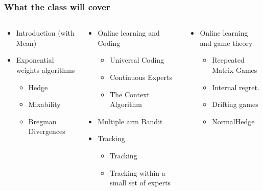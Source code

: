 \documentclass[handout]{beamer}
\begin{document}
\begin{small}
\begin{frame}
  \frametitle{What the class will cover}
  \begin{columns}
    \begin{column}[t]{3.5cm}
      \begin{itemize}
      \item Introduction (with Mean)
      \item Exponential weights algorithms
        \begin{itemize}
        \item Hedge
        \item Mixability
        \item Bregman Divergences
        \end{itemize}
      \end{itemize}
  \end{column}
  \begin{column}[t]{4.5cm}
    \begin{itemize}
    \item Online learning and Coding
      \begin{itemize}
      \item Universal Coding
      \item Continuous Experts
      \item The Context Algorithm
      \end{itemize}
    \item Multiple arm Bandit
    \item Tracking
      \begin{itemize}
      \item Tracking 
      \item Tracking within a small set of experts
      \end{itemize}
    \end{itemize}
  \end{column}
  \begin{column}[t]{4cm}
    \begin{itemize}
    \item Online learning and game theory
      \begin{itemize}
      \item Reepeated Matrix Games
      \item Internal regret.
      \item Drifting games
      \item NormalHedge
      \end{itemize}
      

\end{itemize}
\end{column}
\end{columns}
\end{frame}
\end{small}
\end{document}
